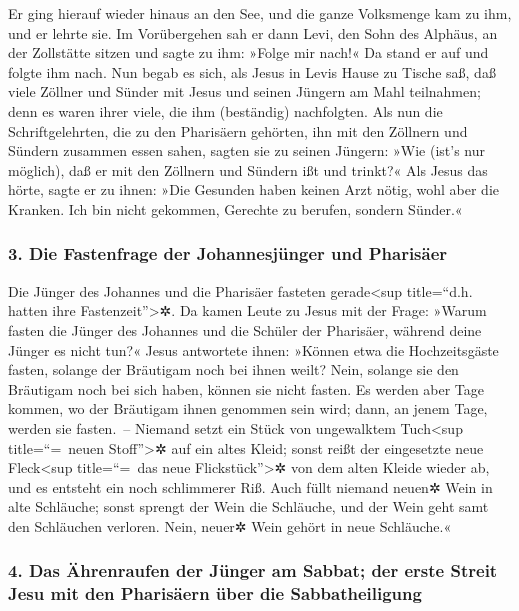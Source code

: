  Er ging hierauf wieder hinaus an den See, und die ganze
Volksmenge kam zu ihm, und er lehrte sie.  Im
Vorübergehen sah er dann Levi, den Sohn des Alphäus, an der Zollstätte
sitzen und sagte zu ihm: »Folge mir nach!« Da stand er auf und folgte
ihm nach.  Nun begab es sich, als Jesus in Levis Hause zu
Tische saß, daß viele Zöllner und Sünder mit Jesus und seinen Jüngern am
Mahl teilnahmen; denn es waren ihrer viele, die ihm (beständig)
nachfolgten.  Als nun die Schriftgelehrten, die zu den
Pharisäern gehörten, ihn mit den Zöllnern und Sündern zusammen essen
sahen, sagten sie zu seinen Jüngern: »Wie (ist's nur möglich), daß er
mit den Zöllnern und Sündern ißt und trinkt?«  Als Jesus
das hörte, sagte er zu ihnen: »Die Gesunden haben keinen Arzt nötig,
wohl aber die Kranken. Ich bin nicht gekommen, Gerechte zu berufen,
sondern Sünder.«

\hypertarget{die-fastenfrage-der-johannesjuxfcnger-und-pharisuxe4er}{%
\subsubsection{3. Die Fastenfrage der Johannesjünger und
Pharisäer}\label{die-fastenfrage-der-johannesjuxfcnger-und-pharisuxe4er}}

 Die Jünger des Johannes und die Pharisäer fasteten
gerade\textless sup title=``d.h. hatten ihre Fastenzeit''\textgreater✲.
Da kamen Leute zu Jesus mit der Frage: »Warum fasten die Jünger des
Johannes und die Schüler der Pharisäer, während deine Jünger es nicht
tun?«  Jesus antwortete ihnen: »Können etwa die
Hochzeitsgäste fasten, solange der Bräutigam noch bei ihnen weilt? Nein,
solange sie den Bräutigam noch bei sich haben, können sie nicht fasten.
 Es werden aber Tage kommen, wo der Bräutigam ihnen
genommen sein wird; dann, an jenem Tage, werden sie fasten.~--
 Niemand setzt ein Stück von ungewalktem
Tuch\textless sup title=``=~neuen Stoff''\textgreater✲ auf ein altes
Kleid; sonst reißt der eingesetzte neue Fleck\textless sup title=``=~das
neue Flickstück''\textgreater✲ von dem alten Kleide wieder ab, und es
entsteht ein noch schlimmerer Riß.  Auch füllt niemand
neuen✲ Wein in alte Schläuche; sonst sprengt der Wein die Schläuche, und
der Wein geht samt den Schläuchen verloren. Nein, neuer✲ Wein gehört in
neue Schläuche.«

\hypertarget{das-uxe4hrenraufen-der-juxfcnger-am-sabbat-der-erste-streit-jesu-mit-den-pharisuxe4ern-uxfcber-die-sabbatheiligung}{%
\subsubsection{4. Das Ährenraufen der Jünger am Sabbat; der erste Streit
Jesu mit den Pharisäern über die
Sabbatheiligung}\label{das-uxe4hrenraufen-der-juxfcnger-am-sabbat-der-erste-streit-jesu-mit-den-pharisuxe4ern-uxfcber-die-sabbatheiligung}}

